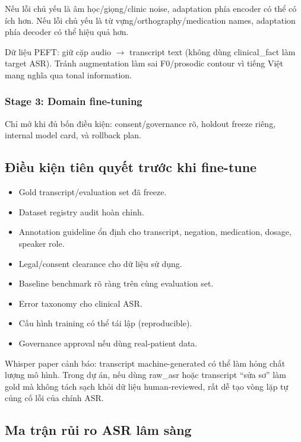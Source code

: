 Nếu lỗi chủ yếu là âm học/giọng/clinic noise, adaptation phía encoder có thể có ích hơn. Nếu lỗi chủ yếu là từ vựng/orthography/medication names, adaptation phía decoder có thể hiệu quả hơn.

Dữ liệu PEFT: giữ cặp audio $\rightarrow$ transcript text (không dùng clinical\_fact làm target ASR). Tránh augmentation làm sai F0/prosodic contour vì tiếng Việt mang nghĩa qua tonal information.

\subsubsection{Stage 3: Domain fine-tuning}

Chỉ mở khi đủ bốn điều kiện: consent/governance rõ, holdout freeze riêng, internal model card, và rollback plan.

\subsection{Điều kiện tiên quyết trước khi fine-tune}

\begin{itemize}
    \item Gold transcript/evaluation set đã freeze.
    \item Dataset registry audit hoàn chỉnh.
    \item Annotation guideline ổn định cho transcript, negation, medication, dosage, speaker role.
    \item Legal/consent clearance cho dữ liệu sử dụng.
    \item Baseline benchmark rõ ràng trên cùng evaluation set.
    \item Error taxonomy cho clinical ASR.
    \item Cấu hình training có thể tái lập (reproducible).
    \item Governance approval nếu dùng real-patient data.
\end{itemize}

Whisper paper cảnh báo: transcript machine-generated có thể làm hỏng chất lượng mô hình. Trong dự án, nếu dùng raw\_asr hoặc transcript ``sửa sơ'' làm gold mà không tách sạch khỏi dữ liệu human-reviewed, rất dễ tạo vòng lặp tự củng cố lỗi của chính ASR.

\subsection{Ma trận rủi ro ASR lâm sàng}


